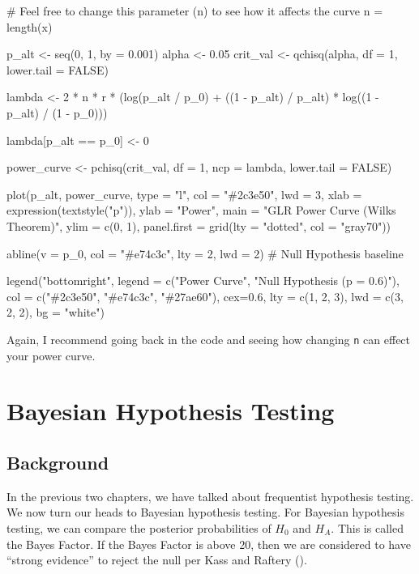 \documentclass[
  letterpaper,
  DIV=11,
  numbers=noendperiod]{scrreprt}
\newenvironment{Shaded}{\begin{snugshade}}{\end{snugshade}}
\newcommand{\NormalTok}[1]{\textcolor[rgb]{0.00,0.23,0.31}{#1}}
\begin{document}
\begin{Shaded}
\begin{Highlighting}[]
\NormalTok{\# Feel free to change this parameter (n) to see how it affects the curve}
\NormalTok{n = length(x)}

\NormalTok{p\_alt \textless{}{-} seq(0, 1, by = 0.001)}
\NormalTok{alpha \textless{}{-} 0.05}
\NormalTok{crit\_val \textless{}{-} qchisq(alpha, df = 1, lower.tail = FALSE)}

\NormalTok{lambda \textless{}{-} 2 * n * r * (log(p\_alt / p\_0) + ((1 {-} p\_alt) / p\_alt) * log((1 {-} p\_alt) / (1 {-} p\_0)))}

\NormalTok{lambda[p\_alt == p\_0] \textless{}{-} 0}

\NormalTok{power\_curve \textless{}{-} pchisq(crit\_val, df = 1, ncp = lambda, lower.tail = FALSE)}

\NormalTok{plot(p\_alt, power\_curve, type = "l", col = "\#2c3e50", lwd = 3,}
\NormalTok{     xlab = expression(textstyle("p")),}
\NormalTok{     ylab = "Power",}
\NormalTok{     main = "GLR Power Curve (Wilks\textquotesingle{} Theorem)",}
\NormalTok{     ylim = c(0, 1), panel.first = grid(lty = "dotted", col = "gray70"))}

\NormalTok{abline(v = p\_0, col = "\#e74c3c", lty = 2, lwd = 2)   \# Null Hypothesis baseline}

\NormalTok{legend("bottomright", }
\NormalTok{       legend = c("Power Curve", "Null Hypothesis (p = 0.6)"),}
\NormalTok{       col = c("\#2c3e50", "\#e74c3c", "\#27ae60"), }
\NormalTok{       cex=0.6,}
\NormalTok{       lty = c(1, 2, 3), lwd = c(3, 2, 2), bg = "white")}
\end{Highlighting}
\end{Shaded}

Again, I recommend going back in the code and seeing how changing
\texttt{n} can effect your power curve.


\chapter{Bayesian Hypothesis Testing}\label{bayesian-hypothesis-testing}

\section{Background}\label{background-8}

In the previous two chapters, we have talked about frequentist
hypothesis testing. We now turn our heads to Bayesian hypothesis
testing. For Bayesian hypothesis testing, we can compare the posterior
probabilities of \(H_0\) and \(H_A\). This is called the Bayes Factor.
If the Bayes Factor is above 20, then we are considered to have ``strong
evidence'' to reject the null per Kass and Raftery
().
\end{document}
